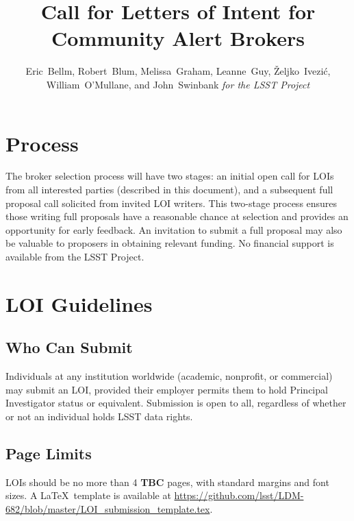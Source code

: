 \documentclass[DM,toc,lsstdraft]{lsstdoc}
\title{Call for Letters of Intent for Community Alert Brokers}
\author{
Eric~Bellm,
Robert~Blum,
Melissa~Graham,
Leanne~Guy,
\v{Z}eljko~Ivezi\'{c},
William~O'Mullane,
and John~Swinbank
\emph{for the LSST Project}
}
\begin{document}

\maketitle

\section{Process}

The broker selection process will have two stages:
an initial open call for LOIs from all interested parties (described in this document), and a subsequent full proposal call solicited from invited LOI writers.
This two-stage process ensures those writing full proposals have a reasonable chance at selection and provides an opportunity for early feedback.
An invitation to submit a full proposal may also be valuable to proposers in obtaining relevant funding.
No financial support is available from the LSST Project.


\section{LOI Guidelines}

\subsection{Who Can Submit}

Individuals at any institution worldwide (academic, nonprofit, or commercial) may submit an LOI, provided their employer permits them to hold Principal Investigator status or equivalent.
Submission is open to all, regardless of whether or not an individual holds LSST data rights.


\subsection{Page Limits}

LOIs should be no more than 4 \textbf{TBC} pages, with standard margins and font sizes.
A \LaTeX\ template is available at \url{https://github.com/lsst/LDM-682/blob/master/LOI_submission_template.tex}.
\end{document}
